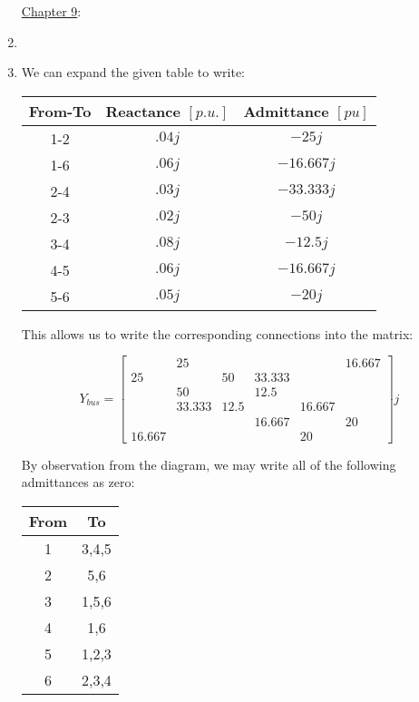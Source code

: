 \begin{enumerate}

    \begin{center}
      \underline{Chapter 9}:
    \end{center}

  \item

  \item

    We can expand the given table to write:

    \begin{center}
      \begin{tabular}[H]{|c|c|c|}
        \hline
        From-To & Reactance $[p.u.]$ & Admittance $[pu]$\\
        \hline
        1-2 & $.04j$ & $-25j$\\
        \hline
        1-6 & $.06j$ & $-16.667j$\\
        \hline
        2-4 & $.03j$ & $-33.333j$\\
        \hline
        2-3 & $.02j$ & $-50j$\\
        \hline
        3-4 & $.08j$ & $-12.5j$\\
        \hline
        4-5 & $.06j$ & $-16.667j$\\
        \hline
        5-6 & $.05j$ & $-20j$\\
        \hline
      \end{tabular}
    \end{center}

    This allows us to write the corresponding connections into the matrix:

    $$Y_{bus}=\left[ \begin{matrix} & 25 & & & & 16.667\\ 25 & & 50 & 33.333 & & \\ & 50 & & 12.5 & & \\ & 33.333 & 12.5 & & 16.667 &\\ & & & 16.667 & & 20\\ 16.667 & & & & 20 &  \end{matrix} \right]j$$

    By observation from the diagram, we may write all of the following admittances as zero:

    \begin{center}
      \begin{tabular}[H]{|c|c|}
        \hline
        From & To\\
        \hline
        1 & 3,4,5\\
        \hline
        2 & 5,6\\
        \hline
        3 & 1,5,6\\
        \hline
        4 & 1,6\\
        \hline
        5 & 1,2,3\\
        \hline
        6 & 2,3,4\\
        \hline
      \end{tabular}
    \end{center}


\end{enumerate}
